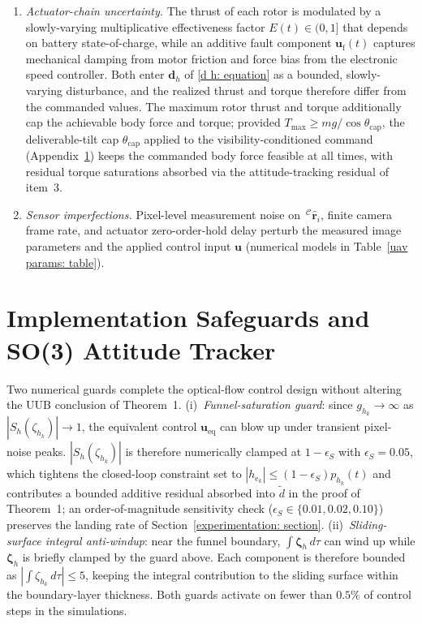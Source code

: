 \documentclass{IEEEtaes}
\begin{document}
\begin{enumerate}
    \item \emph{Actuator-chain uncertainty.} The thrust of each rotor is modulated by a slowly-varying multiplicative effectiveness factor $E(t)\in(0,1]$ that depends on battery state-of-charge, while an additive fault component $\boldsymbol{u}_\text{f}(t)$ captures mechanical damping from motor friction and force bias from the electronic speed controller. Both enter $\boldsymbol{d}_h$ of \eqref{d h: equation} as a bounded, slowly-varying disturbance, and the realized thrust and torque therefore differ from the commanded values. The maximum rotor thrust and torque additionally cap the achievable body force and torque; provided $T_\text{max}\ge mg/\cos\theta_\text{cap}$, the deliverable-tilt cap $\theta_\text{cap}$ applied to the visibility-conditioned command (Appendix~\ref{implementation appendix: section}) keeps the commanded body force feasible at all times, with residual torque saturations absorbed via the attitude-tracking residual of item~3.
    \item \emph{Sensor imperfections.} Pixel-level measurement noise on $\,^\mathcal{C}\hat{\boldsymbol{r}}_i$, finite camera frame rate, and actuator zero-order-hold delay perturb the measured image parameters and the applied control input $\boldsymbol{u}$ (numerical models in Table~\ref{uav params: table}).
\end{enumerate}

\section{Implementation Safeguards and SO(3) Attitude Tracker} \label{implementation appendix: section}
Two numerical guards complete the optical-flow control design without altering the UUB conclusion of Theorem~1. (i)~\emph{Funnel-saturation guard}: since $g_{h_k}\to\infty$ as $|S_h(\zeta_{h_k})|\to 1$, the equivalent control $\boldsymbol{u}_\text{eq}$ can blow up under transient pixel-noise peaks. $|S_h(\zeta_{h_k})|$ is therefore numerically clamped at $1-\epsilon_S$ with $\epsilon_S=0.05$, which tightens the closed-loop constraint set to $|h_{\text{e}_k}|\le(1-\epsilon_S)p_{h_k}(t)$ and contributes a bounded additive residual absorbed into $\tilde{d}$ in the proof of Theorem~1; an order-of-magnitude sensitivity check ($\epsilon_S\in\{0.01,0.02,0.10\}$) preserves the landing rate of Section~\ref{experimentation: section}. (ii)~\emph{Sliding-surface integral anti-windup}: near the funnel boundary, $\int\boldsymbol{\zeta}_h\,d\tau$ can wind up while $\boldsymbol{\zeta}_h$ is briefly clamped by the guard above. Each component is therefore bounded as $|\!\int\!\zeta_{h_k}\,d\tau|\le 5$, keeping the integral contribution to the sliding surface within the boundary-layer thickness. Both guards activate on fewer than $0.5\%$ of control steps in the simulations.
\end{document}
